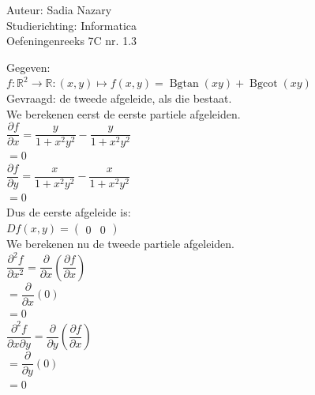 \documentclass[a4paper]{article}
\newcommand{\R}{\mathbb{R}}
\newcommand{\Bgtan}{\operatorname{Bgtan}}
\newcommand{\Bgcot}{\operatorname{Bgcot}}
\begin{document}
\noindent \large Auteur: Sadia Nazary \\
\noindent \large Studierichting: Informatica\\
\noindent \large Oefeningenreeks 7C nr. 1.3\\

\medskip

\normalsize

Gegeven:\\

$f:\R^2\longrightarrow\R:(x,y)\mapsto f(x,y)=\Bgtan(xy)+\Bgcot(xy)$\\

Gevraagd: de tweede afgeleide, als die bestaat.\\

We berekenen eerst de eerste partiele afgeleiden.\\

$\dfrac{\partial f}{\partial x}
=
\dfrac{y}{1+x^2y^2}
-
\dfrac{y}{1+x^2y^2}$\\

$=
0$\\

$\dfrac{\partial f}{\partial y}
=
\dfrac{x}{1+x^2y^2}
-
\dfrac{x}{1+x^2y^2}$\\

$=
0$\\

Dus de eerste afgeleide is:\\

$Df(x,y)=
\left(
\begin{array}{cc}
0 & 0
\end{array}
\right)$\\

We berekenen nu de tweede partiele afgeleiden.\\

$\dfrac{\partial^2 f}{\partial x^2}
=
\dfrac{\partial}{\partial x}
\left(
\dfrac{\partial f}{\partial x}
\right)$\\

$=
\dfrac{\partial}{\partial x}(0)$\\

$=
0$\\

$\dfrac{\partial^2 f}{\partial x\partial y}
=
\dfrac{\partial}{\partial y}
\left(
\dfrac{\partial f}{\partial x}
\right)$\\

$=
\dfrac{\partial}{\partial y}(0)$\\

$=
0$\\
\end{document}

